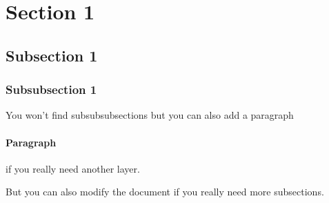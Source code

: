 \section{Section 1}
\subsection{Subsection 1}
\subsubsection{Subsubsection 1}
You won't find subsubsubsections but you can also add a paragraph
\paragraph{Paragraph} 

if you really need another layer.

But you can also modify the document if you really need more subsections.
